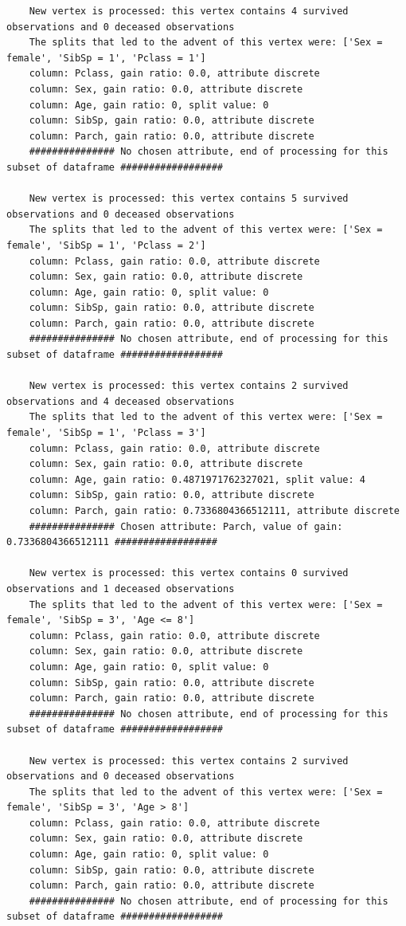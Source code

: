 \documentclass[12pt]{article}
\begin{document}
\begin{verbatim}
	New vertex is processed: this vertex contains 4 survived observations and 0 deceased observations
	The splits that led to the advent of this vertex were: ['Sex = female', 'SibSp = 1', 'Pclass = 1']
	column: Pclass, gain ratio: 0.0, attribute discrete
	column: Sex, gain ratio: 0.0, attribute discrete
	column: Age, gain ratio: 0, split value: 0
	column: SibSp, gain ratio: 0.0, attribute discrete
	column: Parch, gain ratio: 0.0, attribute discrete
	############### No chosen attribute, end of processing for this subset of dataframe ##################
	
	New vertex is processed: this vertex contains 5 survived observations and 0 deceased observations
	The splits that led to the advent of this vertex were: ['Sex = female', 'SibSp = 1', 'Pclass = 2']
	column: Pclass, gain ratio: 0.0, attribute discrete
	column: Sex, gain ratio: 0.0, attribute discrete
	column: Age, gain ratio: 0, split value: 0
	column: SibSp, gain ratio: 0.0, attribute discrete
	column: Parch, gain ratio: 0.0, attribute discrete
	############### No chosen attribute, end of processing for this subset of dataframe ##################
	
	New vertex is processed: this vertex contains 2 survived observations and 4 deceased observations
	The splits that led to the advent of this vertex were: ['Sex = female', 'SibSp = 1', 'Pclass = 3']
	column: Pclass, gain ratio: 0.0, attribute discrete
	column: Sex, gain ratio: 0.0, attribute discrete
	column: Age, gain ratio: 0.4871971762327021, split value: 4
	column: SibSp, gain ratio: 0.0, attribute discrete
	column: Parch, gain ratio: 0.7336804366512111, attribute discrete
	############### Chosen attribute: Parch, value of gain: 0.7336804366512111 ##################
	
	New vertex is processed: this vertex contains 0 survived observations and 1 deceased observations
	The splits that led to the advent of this vertex were: ['Sex = female', 'SibSp = 3', 'Age <= 8']
	column: Pclass, gain ratio: 0.0, attribute discrete
	column: Sex, gain ratio: 0.0, attribute discrete
	column: Age, gain ratio: 0, split value: 0
	column: SibSp, gain ratio: 0.0, attribute discrete
	column: Parch, gain ratio: 0.0, attribute discrete
	############### No chosen attribute, end of processing for this subset of dataframe ##################
	
	New vertex is processed: this vertex contains 2 survived observations and 0 deceased observations
	The splits that led to the advent of this vertex were: ['Sex = female', 'SibSp = 3', 'Age > 8']
	column: Pclass, gain ratio: 0.0, attribute discrete
	column: Sex, gain ratio: 0.0, attribute discrete
	column: Age, gain ratio: 0, split value: 0
	column: SibSp, gain ratio: 0.0, attribute discrete
	column: Parch, gain ratio: 0.0, attribute discrete
	############### No chosen attribute, end of processing for this subset of dataframe ##################
	

\end{verbatim}
\end{document}
